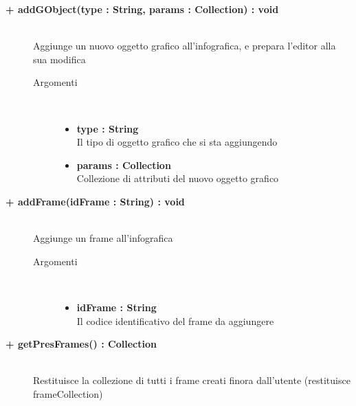 \begin{description}
	\begin{description}
		\item[\textbf{\color{blue}+ addGObject(type : String, params : Collection) : void 	}] \hfill \\
			Aggiunge un nuovo oggetto grafico all'infografica, e prepara l'editor alla sua modifica
			
		\begin{description}
			\item[Argomenti] \hfill \\
				\begin{itemize}
				
					\item \textbf{type : String	} \hfill \\
					Il tipo di oggetto grafico che si sta aggiungendo
					\item \textbf{params : Collection	} \hfill \\
					Collezione di attributi del nuovo oggetto grafico
				\end{itemize}
		\end{description}
	\end{description}
	
	\begin{description}
		\item[\textbf{\color{blue}+ addFrame(idFrame : String) : void 	}] \hfill \\
			Aggiunge un frame all'infografica
			
		\begin{description}
			\item[Argomenti] \hfill \\
				\begin{itemize}
				
					\item \textbf{idFrame : String	} \hfill \\
					Il codice identificativo del frame da aggiungere
				\end{itemize}
		\end{description}
	\end{description}
	
	\begin{description}
		\item[\textbf{\color{blue}+ getPresFrames() : Collection 	}] \hfill \\
			Restituisce la collezione di tutti i frame creati finora dall'utente (restituisce frameCollection)
	

\end{description}
\end{description}
